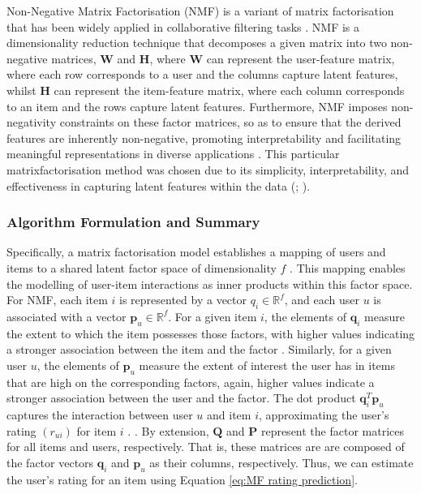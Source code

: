 Non-Negative Matrix Factorisation (NMF) is a variant of matrix factorisation that has been widely applied in collaborative filtering tasks \cite{lee2000algorithms}. NMF is a dimensionality reduction technique that decomposes a given matrix into two non-negative matrices, $\mathbf{W}$ and $\mathbf{H}$, where $\mathbf{W}$ can represent the user-feature matrix, where each row corresponds to a user and the columns capture latent features, whilst $\mathbf{H}$ can represent the item-feature matrix, where each column corresponds to an item and the rows capture latent features. Furthermore, NMF imposes non-negativity constraints on these factor matrices, so as to ensure that the derived features are inherently non-negative, promoting interpretability and facilitating meaningful representations in diverse applications \cite{koren2009matrix}. This particular matrixfactorisation method was chosen due to its simplicity, interpretability, and effectiveness in capturing latent features within the data (\cite{koren2009matrix}; \cite{lee2000algorithms}).


\subsubsection{Algorithm Formulation and Summary}
\label{subsubsec:4 Algorithm Formulation MF}

Specifically, a matrix factorisation model establishes a mapping of users and items to a shared latent factor space of dimensionality $f$ \cite{}. This mapping enables the modelling of user-item interactions as inner products within this factor space. For NMF, each item $i$ is represented by a vector $q_i \in \mathbb{R}^f$, and each user $u$ is associated with a vector $\mathbf{p}_u \in \mathbb{R}^f$. For a given item $i$, the elements of $\mathbf{q}_i$ measure the extent to which the item possesses those factors, with higher values indicating a stronger association between the item and the factor \cite{}. Similarly, for a given user $u$, the elements of $\mathbf{p}_u$ measure the extent of interest the user has in items that are high on the corresponding factors, again, higher values indicate a stronger association between the user and the factor. The dot product $\mathbf{q}_i^T \mathbf{p}_u$ captures the interaction between user $u$ and item $i$, approximating the user's rating $\left(r_{u i}\right)$ for item $i$ \cite{}. . By extension, $\mathbf{Q}$ and $\mathbf{P}$ represent the factor matrices for all items and users, respectively. That is, these matrices are are composed of the factor vectors $\mathbf{q}_i$ and $\mathbf{p}_u$ as their columns, respectively. Thus, we can estimate the user's rating for an item using Equation \ref{eq:MF rating prediction}.

